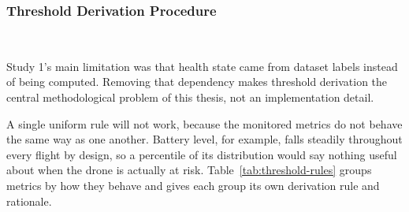 \subsubsection{Threshold Derivation Procedure}~\label{subsec:method-thresholds}

Study 1's main limitation was that health state came from dataset labels instead
of being computed. Removing that dependency makes threshold derivation the
central methodological problem of this thesis, not an implementation detail.

A single uniform rule will not work, because the monitored metrics do not behave
the same way as one another. Battery level, for example, falls steadily
throughout every flight by design, so a percentile of its distribution would say
nothing useful about when the drone is actually at risk.
Table~\ref{tab:threshold-rules} groups metrics by how they behave and gives each
group its own derivation rule and rationale.

